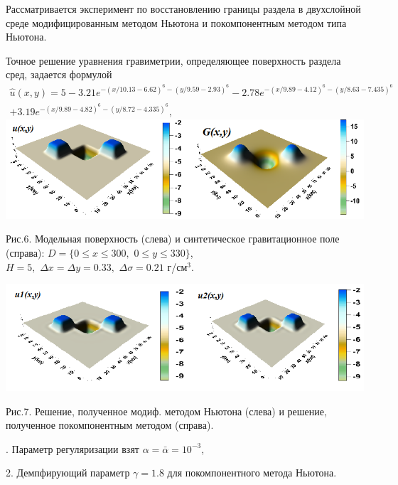 \documentclass[10pt,pdf, mathserif, hyperref={unicode}]{beamer}
\begin{document}
\begin{frame}
	Рассматривается эксперимент по восстановлению границы раздела в двухслойной среде модифицированным методом Ньютона и покомпонентным методом типа Ньютона.
	
	Точное решение уравнения гравиметрии, определяющее поверхность раздела сред, задается формулой
	\begin{equation*}
	\begin{aligned}
	\hat{u}(x,y)=5-3.21e^{-(x/10.13-6.62)^6-(y/9.59-2.93)^6}-2.78e^{-(x/9.89-4.12)^6-(y/8.63-7.435)^6}\\+3.19e^{-(x/9.89-4.82)^6-(y/8.72-4.335)^6},
	\end{aligned} 
	\end{equation*}
	\centering
	\includegraphics[width=\textwidth, height=0.35\textheight]{gravy_kiev2015.png}
	
	Рис.6. Модельная поверхность (слева) и синтетическое гравитационное поле (справа): $D=\{0\le x\le 300, \,\,0\le y\le 330\}$, \\ $  H=5,\,\,\Delta x=\Delta y=0.33,\,\,\Delta\sigma=0.21$ г/см$^3$.
\end{frame}
\begin{frame}
	\includegraphics[width=\textwidth, height=0.35\textheight]{gravy_kiev2015_methods.png}
	
	\centering
	Рис.7. Решение, полученное модиф. методом Ньютона (слева) и решение, полученное покомпонентным методом (справа).
	
	. Параметр регуляризации взят $\alpha=\bar{\alpha}=10^{-3}$,
	
	2. Демпфирующий параметр $\gamma=1.8$ для покомпонентного метода Ньютона.
\end{frame}
\end{document}
